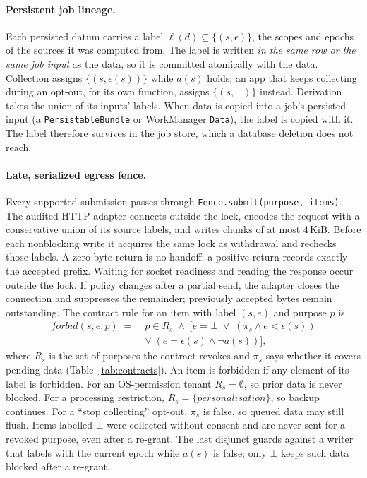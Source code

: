 \paragraph{Persistent job lineage.} Each persisted datum carries a label $\ell(d)\subseteq\{(s,\epsilon)\}$, the scopes and
epochs of the sources it was computed from. The label is written \emph{in the same row or the same job input} as the data,
so it is committed atomically with the data. Collection assigns $\{(s,\epsilon(s))\}$ while $a(s)$ holds; an app that keeps
collecting during an opt-out, for its own function, assigns $\{(s,\bot)\}$ instead. Derivation takes the union of its
inputs' labels. When data is copied into a job's persisted input (a \texttt{PersistableBundle} or WorkManager \texttt{Data}),
the label is copied with it. The label therefore survives in the job store, which a database deletion does not reach.

\paragraph{Late, serialized egress fence.} Every supported submission passes through
\texttt{Fence.submit(purpose, items)}. The audited HTTP adapter connects outside the lock,
encodes the request with a conservative union of its source labels, and writes chunks of at most
4\,KiB. Before each nonblocking write it acquires the same lock as withdrawal and rechecks
those labels. A zero-byte return is no handoff; a positive return records exactly the accepted
prefix. Waiting for socket readiness and reading the response occur outside the lock.
If policy changes after a partial send, the adapter closes the connection and suppresses the
remainder; previously accepted bytes remain outstanding. The contract rule for an item with label
$(s,e)$ and purpose $p$ is
\begin{equation}
\begin{aligned}
\mathit{forbid}(s,e,p)\;=\;{}&p\in R_s\;\wedge\;\big[e=\bot\;\vee\;(\pi_s\wedge e<\epsilon(s))\\
&\vee\;(e=\epsilon(s)\wedge\neg a(s))\big],
\end{aligned}
\label{eq:rule}
\end{equation}
where $R_s$ is the set of purposes the contract revokes and $\pi_s$ says whether it covers pending data
(Table~\ref{tab:contracts}). An item is forbidden if any element of its label is forbidden. For an OS-permission tenant
$R_s=\emptyset$, so prior data is never blocked. For a processing restriction, $R_s=\{\textit{personalisation}\}$, so backup
continues. For a ``stop collecting'' opt-out, $\pi_s$ is false, so queued data may still flush. Items labelled $\bot$
were collected without consent and are never sent for a revoked purpose, even after a re-grant. The last disjunct guards
against a writer that labels with the current epoch while $a(s)$ is false; only $\bot$ keeps such data blocked after a re-grant.

